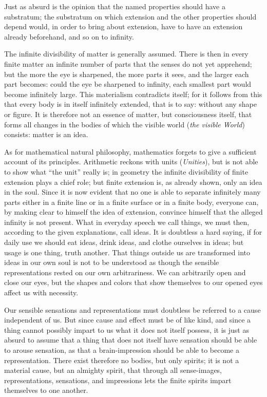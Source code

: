 \documentclass[12pt]{book}
\begin{document}
Just as absurd is the opinion that the named properties should have a substratum;
the substratum on which extension and the other properties should depend would,
in order to bring about extension, have to have an extension already beforehand,
and so on to infinity.

The infinite divisibility of matter is generally assumed. There is then in every
finite matter an infinite number of parts that the senses do not yet apprehend;
but the more the eye is sharpened, the more parts it sees, and the larger each
part becomes: could the eye be sharpened to infinity, each smallest part would
become infinitely large. This materialism contradicts itself; for it follows from
this that every body is in itself infinitely extended, that is to say: without any
shape or figure. It is therefore not an essence of matter, but consciousness
itself, that forms all changes in the bodies of which the visible world
(\textit{the visible World}) consists: matter is an idea.

As for mathematical natural philosophy, mathematics forgets to give a sufficient
account of its principles. Arithmetic reckons with units (\textit{Unities}), but
is not able to show what ``the unit'' really is; in geometry the infinite
divisibility of finite extension plays a chief role; but finite extension is, as
already shown, only an idea in the soul. Since it is now evident that no one is
able to separate infinitely many parts either in a finite line or in a finite
surface or in a finite body, everyone can, by making clear to himself the idea of
extension, convince himself that the alleged infinity is not present.
What in everyday speech we call things, we must then, according to the given
explanations, call ideas. It is doubtless a hard saying, if for daily use we
should eat ideas, drink ideas, and clothe ourselves in ideas; but usage is one
thing, truth another. That things outside us are transformed into ideas in our own
soul is not to be understood as though the sensible representations rested on our
own arbitrariness. We can arbitrarily open and close our eyes, but the shapes and
colors that show themselves to our opened eyes affect us with necessity.

Our sensible sensations and representations must doubtless be referred to a cause
independent of us. But since cause and effect must be of like kind, and since a
thing cannot possibly impart to us what it does not itself possess, it is just as
absurd to assume that a thing that does not itself have sensation should be able
to arouse sensation, as that a brain-impression should be able to become a
representation. There exist therefore no bodies, but only spirits; it is not a
material cause, but an almighty spirit, that through all sense-images,
representations, sensations, and impressions lets the finite spirits impart
themselves to one another.
\end{document}
